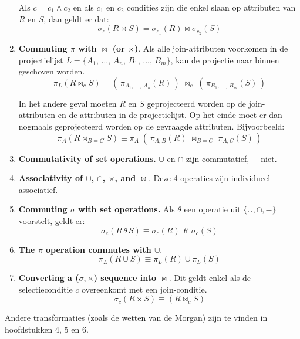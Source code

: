 \begin{enumerate}
	\vspace{-2mm}
	Als $c=c_1 \wedge c_2$ en als $c_1$ en $c_2$ condities zijn die enkel slaan op attributen van $R$ en $S$, dan geldt er dat:
	\vspace{-4mm}
	\[ \sigma_c(R \bowtie S) = \sigma_{c_1}(R) \bowtie \sigma_{c_2}(S) \]

	\item \textbf{Commuting $\pi$ with $\bowtie$ (or $\times$)}. Als alle join-attributen voorkomen in de projectielijst $L = \{ A_1,\, \dots,\, A_n,\, B_1,\, \dots,\, B_m \}$, kan de projectie naar binnen geschoven worden.
	\vspace{-3mm}
	\[ \pi_L(R \bowtie_c S) = (\, \pi_{A_1,\, \dots,\, A_n}(R) \,) \; \bowtie_c \; (\, \pi_{B_1,\, \dots,\, B_m}(S) \,) \]
	
	\vspace{-2mm}
	In het andere geval moeten $R$ en $S$ geprojecteerd worden op de join-attributen en de attributen in de projectielijst. Op het einde moet er dan nogmaals geprojecteerd worden op de gevraagde attributen. Bijvoorbeeld:
	\vspace{-3mm}
	\[ \pi_A(R \bowtie_{B=C} S) \equiv \pi_A \; (\, \pi_{A,B}(R) \; \bowtie_{B=C} \; \pi_{A,C}(S) \,) \]
	
	\item \textbf{Commutativity of set operations.} $\cup$ en $\cap$ zijn commutatief, $-$ niet.

	\item \textbf{Associativity of $\cup$, $\cap$, $\times$, and $\bowtie$}. Deze 4 operaties zijn individueel associatief.

	\item \textbf{Commuting $\sigma$ with set operations.} Als $\theta$ een operatie uit $\{\cup,\cap,-\}$ voorstelt, geldt er:
	\vspace{-3mm}
	\[ \sigma_c (R \,\theta\, S) \equiv \sigma_c(R) \;\,\theta\;\, \sigma_c(S) \]

	\item \textbf{The $\pi$ operation commutes with $\cup$}.
	\vspace{-3mm}
	\[ \pi_L (R \cup S) \equiv \pi_L(R) \cup \pi_L(S) \]

	\item \textbf{Converting a ($\sigma,\times$) sequence into $\bowtie$}. Dit geldt enkel als de selectieconditie $c$ overeenkomt met een join-conditie.
	\vspace{-3mm}
	\[ \sigma_c (R \times S) \equiv (R \bowtie_c S) \]
\end{enumerate}
Andere transformaties (zoals de wetten van de Morgan) zijn te vinden in hoofdstukken 4, 5 en 6.

